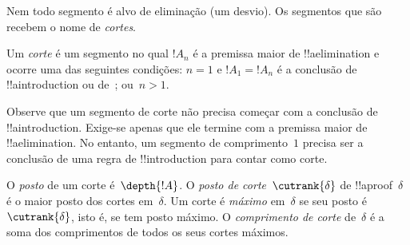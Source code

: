 \documentclass[../../../include/open-logic-section]{subfiles}
\begin{document}
Nem todo segmento é alvo de eliminação (um desvio). Os segmentos que são
recebem o nome de \emph{cortes}.

\begin{defn}
Um \emph{corte} é um segmento no qual $!A_n$ é a premissa maior de
!!a{elimination} e ocorre uma das seguintes condições: $n=1$ e
$!A_1 = !A_n$ é a conclusão de !!a{introduction} ou de~\FalseInt;
ou~$n>1$.
\end{defn}

Observe que um segmento de corte não precisa começar com a conclusão de
!!a{introduction}. Exige-se apenas que ele termine com a premissa maior
de !!a{elimination}. No entanto, um segmento de comprimento~$1$ precisa
ser a conclusão de uma regra de !!{introduction} para contar como corte.

\begin{defn}
O \emph{posto} de um corte é~$\depth{!A}$. O \emph{posto de
corte}~$\cutrank{\delta}$ de !!a{proof}~$\delta$ é o maior posto dos
cortes em~$\delta$. Um corte é \emph{máximo} em~$\delta$ se seu posto é
$\cutrank{\delta}$, isto é, se tem posto máximo. O \emph{comprimento de
corte} de~$\delta$ é a soma dos comprimentos de todos os seus cortes
máximos.
\end{defn}
\end{document}

